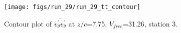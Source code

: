 \begin{figure}[H]
\centering
\texttt{[image: figs/run\_29/run\_29\_tt\_contour]}
\caption{Contour plot of $\overline{v_{\theta}^{\prime} v_{\theta}^{\prime}}$ at $z/c$=7.75, $V_{free}$=31.26, station 3.}
\label{fig:run_29_tt_contour}
\end{figure}


